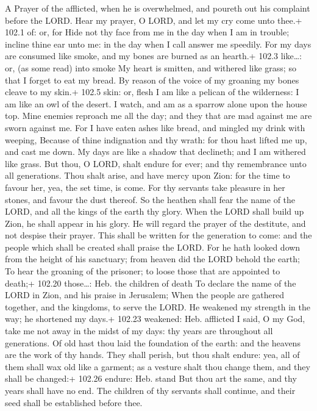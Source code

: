A Prayer of the afflicted, when he is overwhelmed, and poureth out his
complaint before the LORD.  Hear my prayer, O LORD, and let
my cry come unto thee.+ 102.1 of: or, for  Hide not thy face
from me in the day when I am in trouble; incline thine ear unto me: in
the day when I call answer me speedily.  For my days are
consumed like smoke, and my bones are burned as an hearth.+ 102.3
like\ldots: or, (as some read) into smoke  My heart is
smitten, and withered like grass; so that I forget to eat my bread.
 By reason of the voice of my groaning my bones cleave to my
skin.+ 102.5 skin: or, flesh  I am like a pelican of the
wilderness: I am like an owl of the desert.  I watch, and am
as a sparrow alone upon the house top.  Mine enemies
reproach me all the day; and they that are mad against me are sworn
against me.  For I have eaten ashes like bread, and mingled
my drink with weeping,  Because of thine indignation and
thy wrath: for thou hast lifted me up, and cast me down. 
My days are like a shadow that declineth; and I am withered like grass.
 But thou, O LORD, shalt endure for ever; and thy
remembrance unto all generations.  Thou shalt arise, and
have mercy upon Zion: for the time to favour her, yea, the set time, is
come.  For thy servants take pleasure in her stones, and
favour the dust thereof.  So the heathen shall fear the
name of the LORD, and all the kings of the earth thy glory.
 When the LORD shall build up Zion, he shall appear in his
glory.  He will regard the prayer of the destitute, and not
despise their prayer.  This shall be written for the
generation to come: and the people which shall be created shall praise
the LORD.  For he hath looked down from the height of his
sanctuary; from heaven did the LORD behold the earth;  To
hear the groaning of the prisoner; to loose those that are appointed to
death;+ 102.20 those\ldots: Heb. the children of death  To
declare the name of the LORD in Zion, and his praise in Jerusalem;
 When the people are gathered together, and the kingdoms,
to serve the LORD.  He weakened my strength in the way; he
shortened my days.+ 102.23 weakened: Heb. afflicted  I
said, O my God, take me not away in the midst of my days: thy years are
throughout all generations.  Of old hast thou laid the
foundation of the earth: and the heavens are the work of thy hands.
 They shall perish, but thou shalt endure: yea, all of them
shall wax old like a garment; as a vesture shalt thou change them, and
they shall be changed:+ 102.26 endure: Heb. stand  But thou
art the same, and thy years shall have no end.  The
children of thy servants shall continue, and their seed shall be
established before thee.

